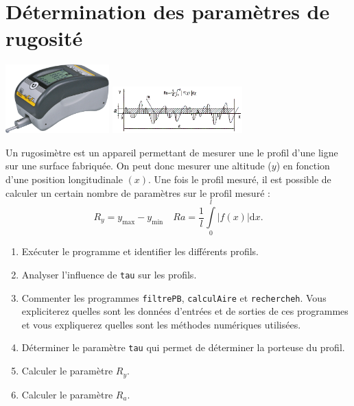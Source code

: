 \documentclass[10pt,fleqn]{article} %
\begin{document}
\newpage
\section{Détermination des paramètres de rugosité}

\begin{center}
\includegraphics[width=4cm]{images/rugosimetre}
\includegraphics[width=5cm]{images/profil}
\end{center}
Un rugosimètre est un appareil permettant de mesurer une le profil d'une ligne sur une surface fabriquée. On peut donc mesurer une altitude ($y$) en fonction d'une position longitudinale $(x)$. Une fois le profil mesuré, il est possible de calculer un certain nombre de paramètres sur le profil mesuré : 
$$
R_y = y_{\text{max}} - y_{\text{min}}  \quad  Ra = \dfrac{1}{l}\int\limits_0^l |f(x)| \text{d} x .
$$

\begin{enumerate}
\item Exécuter le programme et identifier les différents profils.
\item Analyser l'influence de \texttt{tau} sur les profils. 
\item Commenter les programmes \texttt{filtrePB}, \texttt{calculAire} et \texttt{rechercheh}. Vous expliciterez quelles sont les données d'entrées et de sorties de ces programmes et vous expliquerez quelles sont les méthodes numériques utilisées.
\item Déterminer le paramètre \texttt{tau} qui permet de déterminer la porteuse du profil. 
\item Calculer le paramètre $R_y$.
\item Calculer le paramètre $R_a$.
\end{enumerate}


\newpage
\end{document}
